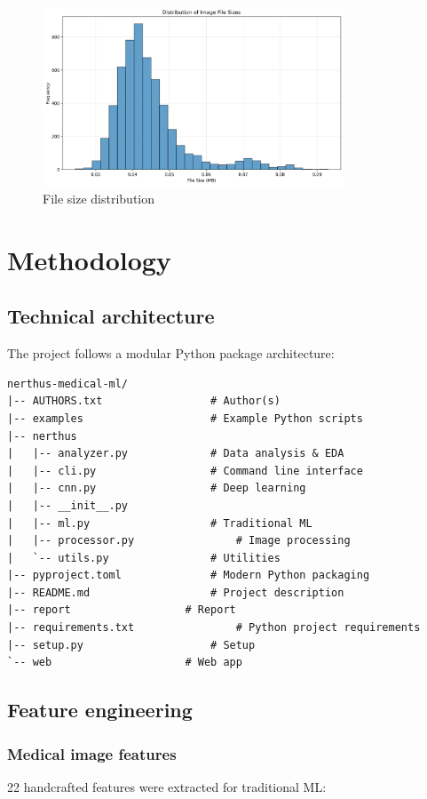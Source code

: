\documentclass[11pt]{article}
\begin{document}
\begin{figure}[H]
\centering
\includegraphics[width=0.8\textwidth]{images/file_size_distribution}
\caption{File size distribution}
\label{fig:file_size_distribution}
\end{figure}

\section{Methodology}

\subsection{Technical architecture}
The project follows a modular Python package architecture:

\begin{lstlisting}
nerthus-medical-ml/
|-- AUTHORS.txt					# Author(s)
|-- examples					# Example Python scripts
|-- nerthus
|   |-- analyzer.py				# Data analysis & EDA
|   |-- cli.py					# Command line interface
|   |-- cnn.py					# Deep learning
|   |-- __init__.py
|   |-- ml.py					# Traditional ML
|   |-- processor.py				# Image processing
|   `-- utils.py				# Utilities
|-- pyproject.toml				# Modern Python packaging
|-- README.md					# Project description
|-- report					# Report
|-- requirements.txt				# Python project requirements
|-- setup.py					# Setup
`-- web						# Web app
\end{lstlisting}

\subsection{Feature engineering}

\subsubsection{Medical image features}
22 handcrafted features were extracted for traditional ML:
\end{document}
